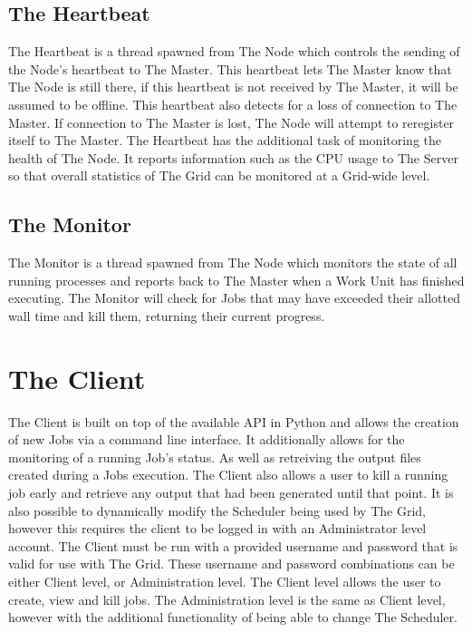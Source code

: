 \subsection{The Heartbeat}

The Heartbeat is a thread spawned from The Node which controls the sending of the Node's heartbeat to The Master. This heartbeat lets The Master know that The Node is still there, if this heartbeat is not received by The Master, it will be assumed to be offline. This heartbeat also detects for a loss of connection to The Master. If connection to The Master is lost, The Node will attempt to reregister itself to The Master. The Heartbeat has the additional task of monitoring the health of The Node. It reports information such as the CPU usage to The Server so that overall statistics of The Grid can be monitored at a Grid-wide level.

\subsection{The Monitor}

The Monitor is a thread spawned from The Node which monitors the state of all running processes and reports back to The Master when a Work Unit has finished executing. The Monitor will check for Jobs that may have exceeded their allotted wall time and kill them, returning their current progress. 

\section{The Client}

The Client is built on top of the available API in Python and allows the creation of new Jobs via a command line interface. It additionally allows for the monitoring of a running Job's status. As well as retreiving the output files created during a Jobs execution. The Client also allows a user to kill a running job early and retrieve any output that had been generated until that point. It is also possible to dynamically modify the Scheduler being used by The Grid, however this requires the client to be logged in with an Administrator level account. The Client must be run with a provided username and password that is valid for use with The Grid. These username and password combinations can be either Client level, or Administration level. The Client level allows the user to create, view and kill jobs. The Administration level is the same as Client level, however with the additional functionality of being able to change The Scheduler.

